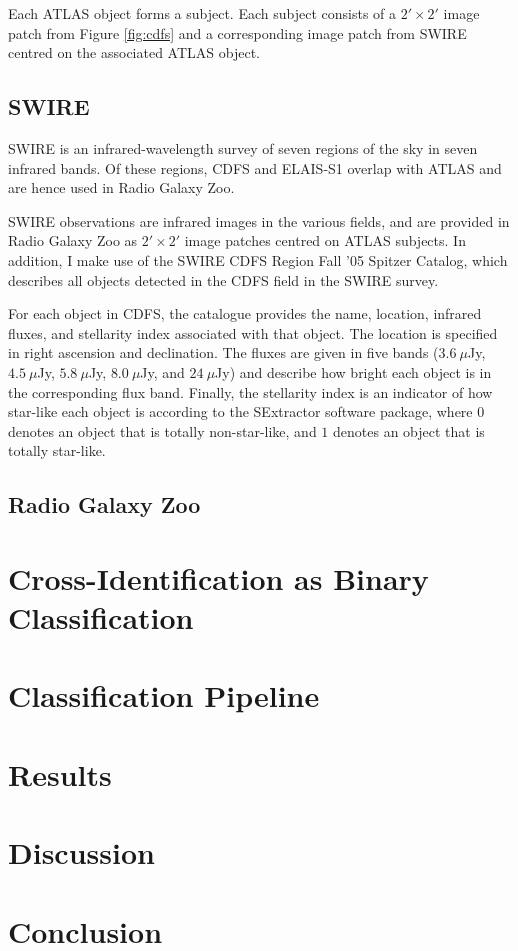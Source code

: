 \documentclass[a4paper]{article}
\newcommand{\fig}{Figure }
\begin{document}
      Each ATLAS object forms a subject. Each subject consists of a $2' \times 2'$ image patch from \fig \ref{fig:cdfs} and a corresponding image patch from SWIRE centred on the associated ATLAS object.

    \subsection{SWIRE}

      SWIRE is an infrared-wavelength survey of seven regions of the sky in seven infrared bands. Of these regions, CDFS and ELAIS-S1 overlap with ATLAS and are hence used in Radio Galaxy Zoo.

      SWIRE observations are infrared images in the various fields, and are provided in Radio Galaxy Zoo as $2' \times 2'$ image patches centred on ATLAS subjects. In addition, I make use of the SWIRE CDFS Region Fall '05 Spitzer Catalog\cite{surace05}, which describes all objects detected in the CDFS field in the SWIRE survey.

      For each object in CDFS, the catalogue provides the name, location, infrared fluxes, and stellarity index associated with that object. The location is specified in right ascension and declination. The fluxes are given in five bands ($3.6\ \mu$Jy, $4.5\ \mu$Jy, $5.8\ \mu$Jy, $8.0\ \mu$Jy, and $24\ \mu$Jy) and describe how bright each object is in the corresponding flux band. Finally, the stellarity index is an indicator of how star-like each object is according to the SExtractor software package, where $0$ denotes an object that is totally non-star-like, and $1$ denotes an object that is totally star-like\cite{surace05}.

    \subsection{Radio Galaxy Zoo}

  \section{Cross-Identification as Binary Classification}

  \section{Classification Pipeline}

  \section{Results}

  \section{Discussion}

  \section{Conclusion}

  
  
\end{document}
